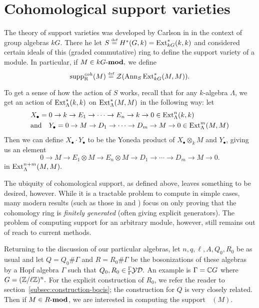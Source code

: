 \documentclass [11pt, proquest] {uwthesis}[2020/02/24]
\DeclareMathOperator{\suppc}{supp^\mathit{coh}_R}
\begin{document}
\section{Cohomological support varieties}
    The theory of support varieties was developed by Carlson in \cite{carlson83} in the context of group algebras $kG$. There he let $S\stackrel{\text{\tiny def}}{=} H^\ast(G,k)=\operatorname{Ext}^\ast_{kG}(k,k)$ and considered certain ideals of this (graded commutative) ring to define the support variety of a module. In particular, if $M\in kG\text{-}\mathbf{mod},$ we define
    \[\suppc(M)\eqdef \calZ(\operatorname{Ann}_S{\Ext_{kG}^\ast(M,M)}).\]
    \begin{rmk}
        To get a sense of how the action of $S$ works, recall that for any $k$-algebra $\Lambda$, we get an action of $\operatorname{Ext}_\Lambda^\ast(k,k)$ on $\operatorname{Ext}_\Lambda^\ast(M,M)$ in the following way: let
        \begin{align*}
            &X_\bullet = 0\to k\to E_1\to \cdots\to E_n\to k\to 0\in \operatorname{Ext}^n_\Lambda(k,k)\\
            &\text{and}\quad Y_\bullet=0\to M\to D_1\to\cdots\to D_m\to M\to 0\in\operatorname{Ext}_\Lambda^m(M,M)
        \end{align*}
        Then we can define $X_\bullet\cdot Y_\bullet$ to be the Yoneda product of $X_\bullet\otimes_k M$ and $Y_\bullet$, giving us an element
        \[0\to M\to E_1\otimes M\to E_n\otimes M\to D_1\to\cdots\to D_m\to M\to 0.\]
        in $\operatorname{Ext}^{n+m}_\Lambda(M,M).$
    \end{rmk}
    
    The ubiquity of cohomological support, as defined above, leaves something to be desired, however. While it is a tractable problem to compute in simple cases, many modern results (such as those in \cite{mpsw09} and \cite{aapw22}) focus on only proving that the cohomology ring is \textit{finitely generated} (often giving explicit generators). The problem of computing support for an arbitrary module, however, still remains out of reach to current methods.
    
    Returning to the discussion of our particular algebras, let $n,q,\ell,A,Q_0,R_0$ be as usual and let $Q=Q_0\#\Gamma$ and $R=R_0\#\Gamma$ be the bosonizations of these algebras by a Hopf algebra $\Gamma$ such that $Q_0,R_0\in{^\Gamma_\Gamma\mathcal{YD}}.$ An example is $\Gamma=\mathbb{C} G$ where $G=(\mathbb{Z}/\ell\mathbb{Z})^n.$ For the explicit construction of $R_0$, we refer the reader to section~\ref{subsec:construction-bqcis}; the construction for $Q$ is very closely related. Then if $M\in R\text{-}\mathbf{mod}$, we are interested in computing the support $\suppc(M).$
    
\end{document}
